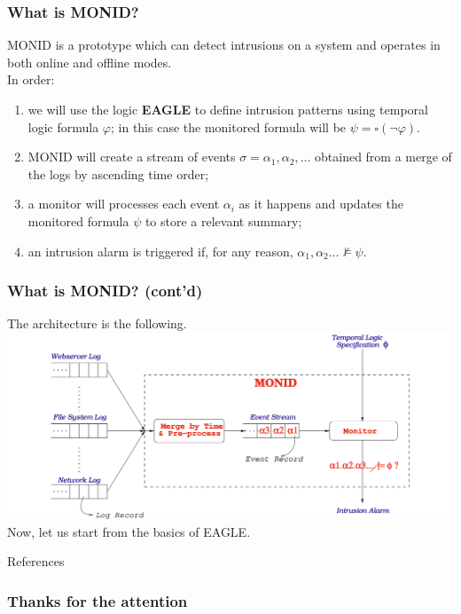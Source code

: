 \documentclass[aspectratio=169,t,xcolor=table]{beamer}
\begin{document}
\begin{frame}
    \frametitle{What is MONID?}
    MONID is a prototype which can detect intrusions on a system and operates in both online and offline modes.\\
    \vspace{5mm}
    In order:
    \begin{enumerate}
        \item we will use the logic \textbf{EAGLE} to define intrusion patterns using temporal logic formula $\varphi$; in this case the monitored formula will be $\psi=\square (\neg\varphi)$.
        \item MONID will create a stream of events $\sigma=\alpha_{1},\alpha_{2},\ldots$ obtained from a merge of the logs by ascending time order;
        \item a monitor will processes each event $\alpha_i$ as it happens and updates the monitored formula $\psi$ to store a relevant summary;
        \item an intrusion alarm is triggered if, for any reason, $\alpha_{1},\alpha_{2} \ldots\not\models\psi$.
    \end{enumerate}
    
\end{frame}

\begin{frame}
    \frametitle{What is MONID? (cont'd)}
    The architecture is the following.\\
    \vspace{2.5mm}
    \includegraphics[scale=0.25]{images/monid.png}
    \vspace{2.5mm}\\
    Now, let us start from the basics of EAGLE.
\end{frame}





\begin{frame}[allowframebreaks]{References}
    \nocite{*} 
    \printbibliography
\end{frame}

\begin{frame}{}
    \frametitle{Thanks for the attention}
\end{frame}
\end{document}
